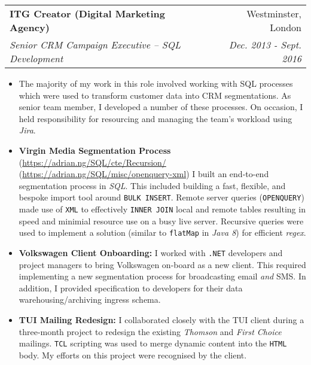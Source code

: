 \documentclass[letterpaper,11pt]{article}
\makeatletter
\newcommand{\resumeSubheading}[4]{
	\vspace{-1pt}\item
	\begin{tabular*}{0.97\textwidth}{l@{\extracolsep{\fill}}r}
		\textbf{#1} & #2 \\
		\textit{\small#3} & \textit{\small #4} \\
	\end{tabular*}\vspace{-5pt}
}
\makeatother
\begin{document}
\resumeSubheading
{ITG Creator (Digital Marketing Agency)}{Westminster, London}
{Senior CRM Campaign Executive -- SQL Development}{Dec. 2013 - Sept. 2016}

\begin{itemize}

	\item[]{
	      The majority of my work in this role involved working with SQL processes which were used to transform customer data into CRM segmentations. As senior team member, I developed a number of these processes. On occasion, I held responsibility for resourcing and managing the team's workload using \textit{Jira}.
	      }
	\item
	      {
	      \textbf{Virgin Media Segmentation Process}
	      \hfill
	      \tiny
	      (\href{https://adrian.ng/SQL/cte/Recursion/}{https://adrian.ng/SQL/cte/Recursion/}
	      \quad
	      (\href{https://adrian.ng/SQL/misc/openquery-xml}{https://adrian.ng/SQL/misc/openquery-xml})
	      \newline
	      \small
	      I built an end-to-end segmentation process in \textit{SQL}. This included building a fast, flexible, and bespoke import tool around \texttt{BULK INSERT}. Remote server queries (\texttt{OPENQUERY}) made use of \texttt{XML} to effectively \texttt{INNER JOIN} local and remote tables resulting in speed and minimial resource use on a busy live server. Recursive queries were used to implement a solution (similar to \texttt{flatMap} in \textit{Java 8}) for efficient \textit{regex}.
	      }
	\item
	      {
	      \textbf{Volkswagen Client Onboarding:}
	      \quad
	      I worked with \texttt{.NET} developers and project managers to bring Volkswagen on-board as a new client. This required implementing a new segmentation process for broadcasting email \textit{and} SMS. In addition, I provided specification to developers for their data warehousing/archiving ingress schema.
	      }
	\item
	      {
	      \textbf{TUI Mailing Redesign:}
	      \quad
	      I collaborated closely with the TUI client during a three-month project to redesign the existing \textit{Thomson} and \textit{First Choice} mailings.	\texttt{TCL} scripting was used to merge dynamic content into the \texttt{HTML} body. My efforts on this project were recognised by the client.
	      }
\end{itemize}

\end{document}
